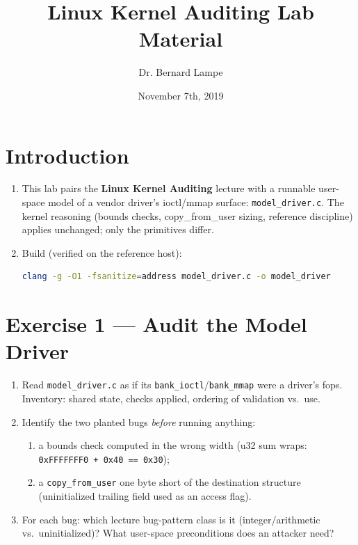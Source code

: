 \documentclass[12pt]{Training}
\title{Linux Kernel Auditing Lab Material}
\author{Dr. Bernard Lampe}
\date{November 7th, 2019}
\begin{document}
\maketitle


\section*{Introduction}
\begin{enumerate}
    \item This lab pairs the \textbf{Linux Kernel Auditing} lecture with a runnable user-space model of a vendor driver's ioctl/mmap surface: \lstinline{model_driver.c}. The kernel reasoning (bounds checks, copy\_from\_user sizing, reference discipline) applies unchanged; only the primitives differ.
    \item Build (verified on the reference host):
    \begin{lstlisting}[language=bash]
clang -g -O1 -fsanitize=address model_driver.c -o model_driver
    \end{lstlisting}
\end{enumerate}

\section*{Exercise 1 --- Audit the Model Driver}
\begin{enumerate}
    \item Read \lstinline{model_driver.c} as if its \lstinline{bank_ioctl}/\lstinline{bank_mmap} were a driver's fops. Inventory: shared state, checks applied, ordering of validation vs.\ use.
    \item Identify the two planted bugs \emph{before} running anything:
        \begin{enumerate}
            \item a bounds check computed in the wrong width (u32 sum wraps: \lstinline{0xFFFFFFF0 + 0x40 == 0x30});
            \item a \lstinline{copy_from_user} one byte short of the destination structure (uninitialized trailing field used as an access flag).
        \end{enumerate}
    \item For each bug: which lecture bug-pattern class is it (integer/arithmetic vs.\ uninitialized)? What user-space preconditions does an attacker need?
\end{enumerate}
\end{document}
